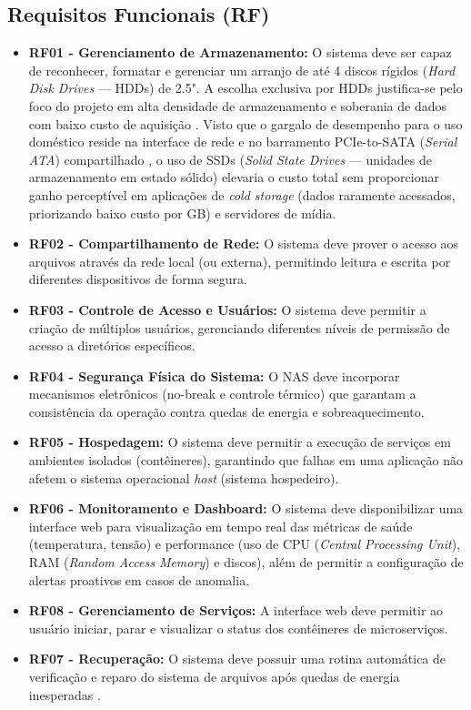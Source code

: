 \documentclass[a4paper,12pt]{article}
\begin{document}
\subsection{Requisitos Funcionais (RF)}
\begin{itemize}
    \item \textbf{RF01 - Gerenciamento de Armazenamento:} O sistema deve ser capaz de reconhecer, formatar e gerenciar um arranjo de até 4 discos rígidos (\textit{Hard Disk Drives} --- HDDs) de 2.5". A escolha exclusiva por HDDs justifica-se pelo foco do projeto em alta densidade de armazenamento e soberania de dados com baixo custo de aquisição \cite{berl2010}. Visto que o gargalo de desempenho para o uso doméstico reside na interface de rede e no barramento PCIe-to-SATA (\textit{Serial ATA}) compartilhado \cite{halfacree2023}, o uso de SSDs (\textit{Solid State Drives} --- unidades de armazenamento em estado sólido) elevaria o custo total sem proporcionar ganho perceptível em aplicações de \textit{cold storage} (dados raramente acessados, priorizando baixo custo por GB) e servidores de mídia.
    \item \textbf{RF02 - Compartilhamento de Rede:} O sistema deve prover o acesso aos arquivos através da rede local (ou externa), permitindo leitura e escrita por diferentes dispositivos de forma segura.
    \item \textbf{RF03 - Controle de Acesso e Usuários:} O sistema deve permitir a criação de múltiplos usuários, gerenciando diferentes níveis de permissão de acesso a diretórios específicos.
    \item \textbf{RF04 - Segurança Física do Sistema:} O NAS deve incorporar mecanismos eletrônicos (no-break e controle térmico) que garantam a consistência da operação contra quedas de energia e sobreaquecimento.
    \item \textbf{RF05 - Hospedagem:} O sistema deve permitir a execução de serviços em ambientes isolados (contêineres), garantindo que falhas em uma aplicação não afetem o sistema operacional \textit{host} (sistema hospedeiro).
    \item \textbf{RF06 - Monitoramento e Dashboard:} O sistema deve disponibilizar uma interface web para visualização em tempo real das métricas de saúde (temperatura, tensão) e performance (uso de CPU (\textit{Central Processing Unit}), RAM (\textit{Random Access Memory}) e discos), além de permitir a configuração de alertas proativos em casos de anomalia.
    \item \textbf{RF08 - Gerenciamento de Serviços:} A interface web deve permitir ao usuário iniciar, parar e visualizar o status dos contêineres de microserviços.
    \item
    \textbf{RF07 - Recuperação:} O sistema deve possuir uma rotina automática de verificação e reparo do sistema de arquivos após quedas de energia inesperadas \cite{prabhakaran2005}.
\end{itemize}
\end{document}
